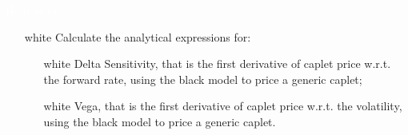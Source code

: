 \documentclass{beamer}
\begin{document}
\begin{homework}
\begin{frame}{\textcolor{white}{Homework}}
\begin{itemize}
\item[white] Calculate the analytical expressions for:
\begin{itemize}
	\item[white] Delta Sensitivity, that is the first derivative of caplet price w.r.t. the forward rate, using the black model to price a generic caplet;
	\item[white] Vega, that is the first derivative of caplet price w.r.t. the volatility, using the black model to price a generic caplet.
\end{itemize}
\end{itemize}
\end{frame}
\end{homework}
\end{document}
